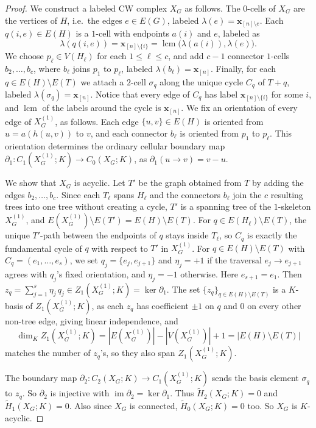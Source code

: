 \documentclass[12pt]{amsart}
\begin{document}
\begin{proof}
We construct a labeled CW complex $X_G$ as follows.
The $0$-cells of $X_G$ are the vertices of $H$, i.e.\ the edges $e\in E(G)$, labeled $\lambda(e)=\mathbf x_{[n]\setminus e}$. Each $q(i,e)\in E(H)$ is a $1$-cell with endpoints $a(i)$ and $e$, labeled as
				\[
				\lambda(q(i,e))=\mathbf x_{[n]\setminus\{i\}}=\operatorname{lcm}\big(\lambda(a(i)),\lambda(e)\big).
				\]
				 We choose $p_\ell\in V(H_\ell)$ for each $1\leq\ell\leq c$, and add $c-1$ connector $1$-cells $b_2,\dots,b_c$, where $b_\ell$ joins $p_1$ to $p_\ell$, labeled $\lambda(b_\ell)=\mathbf x_{[n]}$. Finally, for each $q\in E(H)\setminus E(T)$ we attach a $2$-cell $\sigma_q$ along the unique cycle $C_q$ of $T+q$, labeled $\lambda(\sigma_q)=\mathbf x_{[n]}$. Notice that every edge of $C_q$ has label $\mathbf x_{[n]\setminus\{i\}}$ for some $i$, and $\operatorname{lcm}$ of the labels around the cycle is $\mathbf x_{[n]}$. We fix an orientation of every edge of $X_G^{(1)}$, as follows. Each edge $\{u,v\}\in E(H)$ is oriented from $u=a(h(u,v))$ to $v$, and each connector $b_\ell$ is oriented from $p_1$ to $p_\ell$.  This orientation determines the ordinary cellular boundary map $\partial_1:C_1(X_G^{(1)};K)\to C_0(X_G;K)$, as $\partial_1(u\to v)=v-u$.
				 
				
				We show that $X_G$ is acyclic.
				Let $T'$ be the graph obtained from $T$ by adding the edges $b_2,\dots,b_c$. Since each $T_\ell$ spans $H_\ell$ and the connectors $b_\ell$ join the $c$ resulting trees into one tree without creating a cycle, $T'$ is a spanning tree of the $1$-skeleton $X_G^{(1)}$, and $E(X_G^{(1)})\setminus E(T')=E(H)\setminus E(T)$. For $q\in E(H_\ell)\setminus E(T)$, the unique $T'$-path between the endpoints of $q$ stays inside $T_\ell$, so $C_q$ is exactly the fundamental cycle of $q$ with respect to  $T'$ in $X_G^{(1)}$.
				For $q \in E(H)\setminus E(T)$ with $C_q=(e_1,\dots,e_s)$, we set $q_j=\{e_j,e_{j+1}\}$  and  $\eta_j=+1$ if the traversal $e_j\to e_{j+1}$ agrees with $q_j$'s fixed orientation, and $\eta_j=-1$ otherwise. Here $e_{s+1}=e_1$. Then $z_q=\sum_{j=1}^{s}\eta_j\,q_j \in Z_1(X_G^{(1)};K) = \ker \partial_1$.
				The set $\{z_q\}_{q\in E(H)\setminus E(T)}$ is a $K$-basis of $Z_1(X_G^{(1)};K)$, as each $z_q$ has coefficient $\pm1$ on $q$ and $0$ on every other non-tree edge, giving linear independence, and
			\[
			\dim_K Z_1(X_G^{(1)};K)=|E(X_G^{(1)})|-|V(X_G^{(1)})|+1=|E(H)\setminus E(T)|
			\]
			matches the number of $z_q$'s, so they also span $Z_1(X_G^{(1)};K)$.
                
				The boundary map $\partial_2:C_2(X_G;K)\to C_1(X_G^{(1)};K)$ sends the basis element $\sigma_q$ to $z_q$. So $\partial_2$ is injective with $\operatorname{im}\partial_2=\ker\partial_1$. Thus $\widetilde H_2(X_G;K)=0$ and $\widetilde H_1(X_G;K)=0$. Also since $X_G$ is connected, $\widetilde H_0(X_G;K)=0$ too. So $X_G$ is $K$-acyclic.
				

\end{proof}
\end{document}
